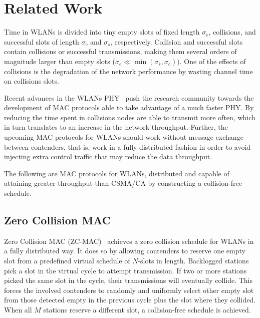 \section{Related Work}\label{relatedWork}
Time in WLANs is divided into tiny empty slots of fixed length $\sigma_{e}$, collisions, and successful slots of length $\sigma_{c}$ and $\sigma_{s}$, respectively. Collision and successful slots contain collisions or successful transmissions, making them several orders of magnitude larger than empty slots ($\sigma_{e}\ll\min(\sigma_{s},\sigma_{c}))$. One of the effects of collisions is the degradation of the network performance by wasting channel time on collisions slots. 

Recent advances in the WLANs PHY~\cite{perahia2008ieee,6191306} push the research community towards the development of MAC protocols able to take advantage of a much faster PHY. By reducing the time spent in collisions nodes are able to transmit more often, which in turn translates to an increase in the network throughput. Further, the upcoming MAC protocols for WLANs should work without message exchange between contenders, that is, work in a fully distributed fashion in order to avoid injecting extra control traffic that may reduce the data throughput.

The following are MAC protocols for WLANs, distributed and capable of attaining greater throughput than CSMA/CA by constructing a collision-free schedule.

\subsection{Zero Collision MAC} 

Zero Collision MAC (ZC-MAC)~\cite{ZMAC} achieves a zero collision schedule for WLANs in a fully distributed way. It does so by allowing contenders to reserve one empty slot from a predefined virtual schedule of $N$-slots in length. Backlogged stations pick a slot in the virtual cycle to attempt transmission. If two or more stations picked the same slot in the cycle, their transmissions will eventually collide. This forces the involved contenders to randomly and uniformly select other empty slot from those detected empty in the previous cycle plus the slot where they collided. When all $M$ stations reserve a different slot, a collision-free schedule is achieved.

